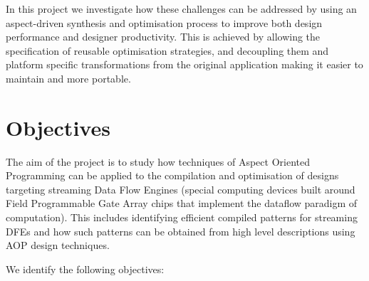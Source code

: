 In this project we investigate how these challenges can be addressed
by using an aspect-driven synthesis and optimisation process to
improve both design performance and designer productivity. This is
achieved by allowing the specification of reusable optimisation
strategies, and decoupling them and platform specific transformations
from the original application making it easier to maintain and more
portable.

\section{Objectives}

The aim of the project is to study how techniques of Aspect Oriented
Programming can be applied to the compilation and optimisation of
designs targeting streaming Data Flow Engines (special computing
devices built around Field Programmable Gate Array chips that
implement the dataflow paradigm of computation). This includes
identifying efficient compiled patterns for streaming DFEs and how
such patterns can be obtained from high level descriptions using AOP
design techniques.

We identify the following objectives:

